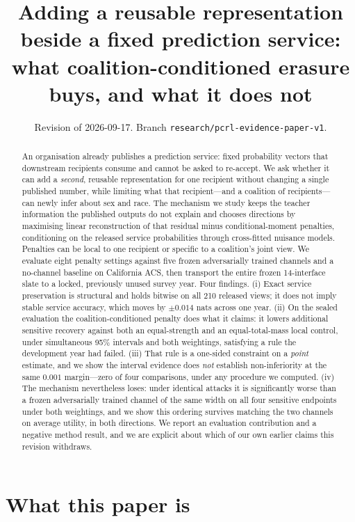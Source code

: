 \documentclass[10pt]{article}
\title{Adding a reusable representation beside a fixed prediction service:\\
what coalition-conditioned erasure buys, and what it does not}
\author{}
\date{Revision of 2026-09-17. Branch \texttt{research/pcrl-evidence-paper-v1}.}
\begin{document}
\maketitle

\begin{abstract}
An organisation already publishes a prediction service: fixed probability vectors that downstream
recipients consume and cannot be asked to re-accept. We ask whether it can add a \emph{second},
reusable representation for one recipient without changing a single published number, while limiting
what that recipient---and a coalition of recipients---can newly infer about sex and race. The
mechanism we study keeps the teacher information the published outputs do not explain and chooses
directions by maximising linear reconstruction of that residual minus conditional-moment penalties,
conditioning on the released service probabilities through cross-fitted nuisance models. Penalties
can be local to one recipient or specific to a coalition's joint view. We evaluate eight penalty
settings against five frozen adversarially trained channels and a no-channel baseline on California
ACS, then transport the entire frozen 14-interface slate to a locked, previously unused survey year.
Four findings. (i) Exact service preservation is structural and holds bitwise on all 210 released
views; it does not imply stable service accuracy, which moves by $\pm0.014$ nats across one year.
(ii) On the sealed evaluation the coalition-conditioned penalty does what it claims: it lowers
additional sensitive recovery against both an equal-strength and an equal-total-mass local control,
under simultaneous 95\% intervals and both weightings, satisfying a rule the development year had
failed. (iii) That rule is a one-sided constraint on a \emph{point} estimate, and we show the
interval evidence does \emph{not} establish non-inferiority at the same $0.001$ margin---zero of four
comparisons, under any procedure we computed. (iv) The mechanism nevertheless loses: under identical
attacks it is significantly worse than a frozen adversarially trained channel of the same width on
all four sensitive endpoints under both weightings, and we show this ordering survives matching the
two channels on average utility, in both directions. We report an evaluation contribution and a
negative method result, and we are explicit about which of our own earlier claims this revision
withdraws.
\end{abstract}

\section{What this paper is}
\label{sec:contribution}
\end{document}
